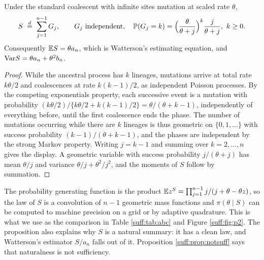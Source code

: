 \begin{proposition}
\label{suff:prop:Slaw}
Under the standard coalescent with infinite sites mutation at scaled rate $\theta$,
\[
S \;\stackrel{d}{=}\; \sum_{j=1}^{n-1}G_j,
\qquad G_j \ \text{independent},\quad
\Prob(G_j=k)=\Big(\frac{\theta}{\theta+j}\Big)^{k}\frac{j}{\theta+j},\ k\ge0 .
\]
Consequently $\mathbb{E} S=\theta a_n$, which is Watterson's estimating equation, and
$\mathrm{Var} S=\theta a_n+\theta^2 b_n$.
\end{proposition}

\begin{proof}
While the ancestral process has $k$ lineages, mutations arrive at total rate $k\theta/2$ and
coalescences at rate $k(k-1)/2$, as independent Poisson processes. By the competing
exponentials property, each successive event is a mutation with probability
$(k\theta/2)/\{k\theta/2+k(k-1)/2\}=\theta/(\theta+k-1)$, independently of everything before,
until the first coalescence ends the phase. The number of mutations occurring while there are
$k$ lineages is thus geometric on $\{0,1,\dots\}$ with success probability
$(k-1)/(\theta+k-1)$, and the phases are independent by the strong Markov property. Writing
$j=k-1$ and summing over $k=2,\dots,n$ gives the display. A geometric variable with success
probability $j/(\theta+j)$ has mean $\theta/j$ and variance $\theta/j+\theta^2/j^2$, and the
moments of $S$ follow by summation.
\end{proof}

The probability generating function is the product
$\mathbb{E} z^S=\prod_{j=1}^{n-1}j/(j+\theta-\theta z)$, so the law of $S$ is a convolution of $n-1$
geometric mass functions and $\pi(\theta\mid S)$ can be computed to machine precision on a
grid or by adaptive quadrature. This is what we use as the comparison in Table
\ref{suff:tab:abc} and Figure \ref{suff:fig:p2}. The proposition also explains why $S$ is a
natural summary: it has a clean law, and Watterson's estimator $S/a_n$ falls out of it.
Proposition \ref{suff:prop:notsuff} says that naturalness is not sufficiency.

